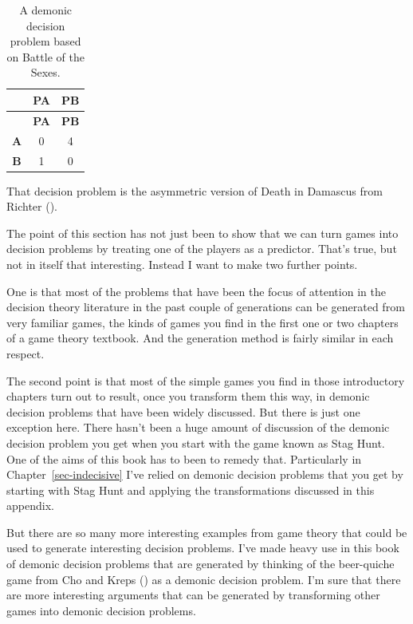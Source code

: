\documentclass[
  12pt,
  letterpaper,
  DIV=11,
  numbers=noendperiod]{scrreprt}
\begin{document}
\begin{longtable}[]{@{}ccc@{}}
\caption{A demonic decision problem based on Battle of the
Sexes.}\label{tbl-asymm-death-damascus}\tabularnewline
\toprule\noalign{}
& \textbf{PA} & \textbf{PB} \\
\midrule\noalign{}
\endfirsthead
\toprule\noalign{}
& \textbf{PA} & \textbf{PB} \\
\midrule\noalign{}
\endhead
\bottomrule\noalign{}
\endlastfoot
\textbf{A} & 0 & 4 \\
\textbf{B} & 1 & 0 \\
\end{longtable}

That decision problem is the asymmetric version of Death in Damascus
from Richter ().

The point of this section has not just been to show that we can turn
games into decision problems by treating one of the players as a
predictor. That's true, but not in itself that interesting. Instead I
want to make two further points.

One is that most of the problems that have been the focus of attention
in the decision theory literature in the past couple of generations can
be generated from very familiar games, the kinds of games you find in
the first one or two chapters of a game theory textbook. And the
generation method is fairly similar in each respect.

The second point is that most of the simple games you find in those
introductory chapters turn out to result, once you transform them this
way, in demonic decision problems that have been widely discussed. But
there is just one exception here. There hasn't been a huge amount of
discussion of the demonic decision problem you get when you start with
the game known as Stag Hunt. One of the aims of this book has to been to
remedy that. Particularly in Chapter~\ref{sec-indecisive} I've relied on
demonic decision problems that you get by starting with Stag Hunt and
applying the transformations discussed in this appendix.

But there are so many more interesting examples from game theory that
could be used to generate interesting decision problems. I've made heavy
use in this book of demonic decision problems that are generated by
thinking of the beer-quiche game from Cho and Kreps
() as a demonic decision problem. I'm
sure that there are more interesting arguments that can be generated by
transforming other games into demonic decision problems.
\end{document}
